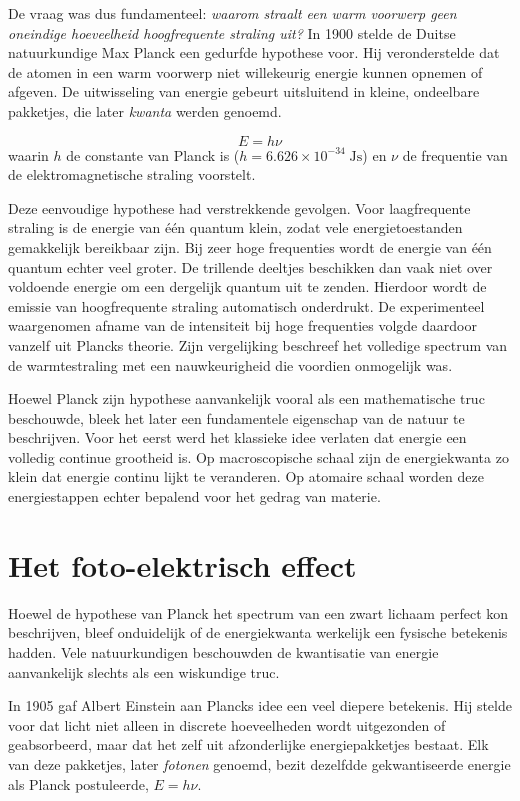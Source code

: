 De vraag was dus fundamenteel: \emph{waarom straalt een warm voorwerp geen oneindige hoeveelheid hoogfrequente straling uit?}  In 1900 stelde de Duitse natuurkundige Max Planck een gedurfde hypothese voor. Hij veronderstelde dat de atomen in een warm voorwerp niet willekeurig energie kunnen opnemen of afgeven. De uitwisseling van energie gebeurt uitsluitend in kleine, ondeelbare pakketjes, die later \emph{kwanta} werden genoemd.

\begin{equation}
\boxed{
E=h\nu
}
\end{equation}
waarin $h$ de constante van Planck is ($h=6.626\times10^{-34}\;\si{\joule\second}$) en $\nu$ de frequentie van de elektromagnetische straling voorstelt.

Deze eenvoudige hypothese had verstrekkende gevolgen. Voor laagfrequente straling is de energie van één quantum klein, zodat vele energietoestanden gemakkelijk bereikbaar zijn. Bij zeer hoge frequenties wordt de energie van één quantum echter veel groter. De trillende deeltjes beschikken dan vaak niet over voldoende energie om een dergelijk quantum uit te zenden. Hierdoor wordt de emissie van hoogfrequente straling automatisch onderdrukt. De experimenteel waargenomen afname van de intensiteit bij hoge frequenties volgde daardoor vanzelf uit Plancks theorie. Zijn vergelijking beschreef het volledige spectrum van de warmtestraling met een nauwkeurigheid die voordien onmogelijk was.

Hoewel Planck zijn hypothese aanvankelijk vooral als een mathematische truc beschouwde, bleek het later een fundamentele eigenschap van de natuur te beschrijven. Voor het eerst werd het klassieke idee verlaten dat energie een volledig continue grootheid is. Op macroscopische schaal zijn de energiekwanta zo klein dat energie continu lijkt te veranderen. Op atomaire schaal worden deze energiestappen echter bepalend voor het gedrag van materie.

\section{Het foto-elektrisch effect}

Hoewel de hypothese van Planck het spectrum van een zwart lichaam perfect kon beschrijven, bleef onduidelijk of de energiekwanta werkelijk een fysische betekenis hadden. Vele natuurkundigen beschouwden de kwantisatie van energie aanvankelijk slechts als een wiskundige truc.

In 1905 gaf Albert Einstein aan Plancks idee een veel diepere betekenis. Hij stelde voor dat licht niet alleen in discrete hoeveelheden wordt uitgezonden of geabsorbeerd, maar dat het zelf uit afzonderlijke energiepakketjes bestaat. Elk van deze pakketjes, later \emph{fotonen} genoemd, bezit dezelfdde gekwantiseerde energie als Planck postuleerde, $E=h\nu$.

